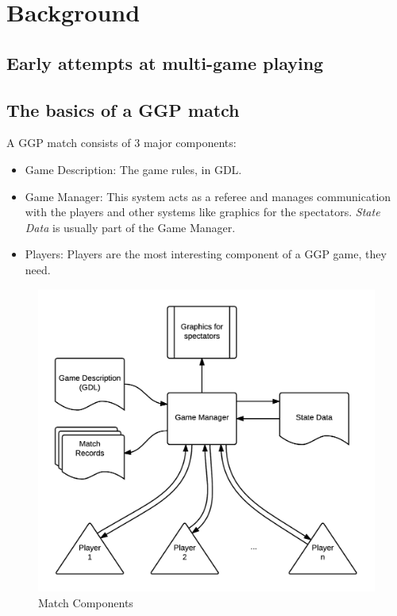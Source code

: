
\chapter{Background}
\label{chapter:background}

\section{Early attempts at multi-game playing}


\section{The basics of a GGP match}

A \gls{GGP} match consists of 3 major components:
\begin{itemize}
\item Game Description: The game rules, in \gls{GDL}.

\item Game Manager: This system acts as a referee and manages communication with the players and other systems like graphics for the spectators. \textit{State Data} is usually part of the Game Manager.

\item Players: Players are the most interesting component of a \gls{GGP} game, they need.

\end{itemize}

\begin{figure}[h]
	\centering
    \includegraphics[scale=0.8]{images/GGPgamesetup.png}
    \caption{Match Components}
    \label{fig:match components}
\end{figure}

